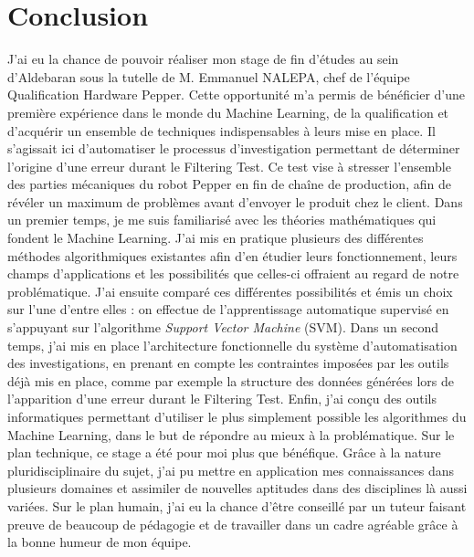 \chapter{Conclusion}
\label{Conclusion}
\thispagestyle{fancy}

J'ai eu la chance de pouvoir réaliser mon stage de fin d'études au sein d'Aldebaran sous la tutelle de M. Emmanuel NALEPA, chef de l'équipe Qualification Hardware Pepper. Cette opportunité m'a permis de bénéficier d'une première expérience dans le monde du Machine Learning, de la qualification et d'acquérir un ensemble de techniques indispensables à leurs mise en place. Il s'agissait ici d'automatiser le processus d'investigation permettant de déterminer l'origine d'une erreur durant le Filtering Test. Ce test vise à stresser l'ensemble des parties mécaniques du robot Pepper en fin de chaîne de production, afin de révéler un maximum de problèmes avant d'envoyer le produit chez le client.
\newline
\newline
Dans un premier temps, je me suis familiarisé avec les théories mathématiques qui fondent le Machine Learning. J'ai mis en pratique plusieurs des différentes méthodes algorithmiques existantes afin d'en étudier leurs fonctionnement, leurs champs d'applications et les possibilités que celles-ci offraient au regard de notre problématique. J'ai ensuite comparé ces différentes possibilités et émis un choix sur l'une d'entre elles : on effectue de l'apprentissage automatique supervisé en s'appuyant sur l'algorithme \emph{Support Vector Machine} (SVM).
\newline
Dans un second temps, j'ai mis en place l'architecture fonctionnelle du système d'automatisation des investigations, en prenant en compte les contraintes imposées par les outils déjà mis en place, comme par exemple la structure des données générées lors de l'apparition d'une erreur durant le Filtering Test. 
\newline
Enfin, j'ai conçu des outils informatiques permettant d'utiliser le plus simplement possible les algorithmes du Machine Learning, dans le but de répondre au mieux à la problématique. 
\newline
\newline
Sur le plan technique, ce stage a été pour moi plus que bénéfique. Grâce à la nature pluridisciplinaire du sujet, j'ai pu mettre en application mes connaissances dans plusieurs domaines et assimiler de nouvelles aptitudes dans des disciplines là aussi variées. Sur le plan humain, j'ai eu la chance d’être conseillé par un tuteur faisant preuve de beaucoup de pédagogie et de travailler dans un cadre agréable grâce à la bonne humeur de mon équipe.